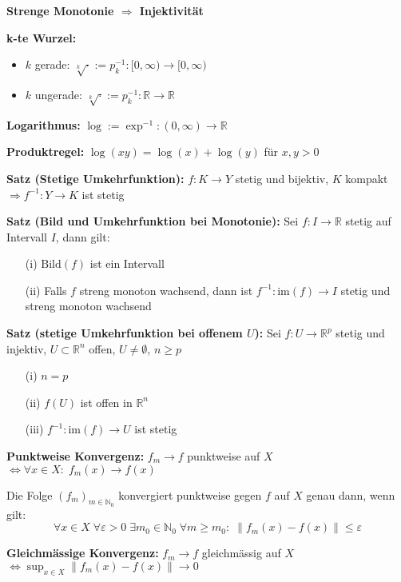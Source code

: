 \begin{itemize}
\textbf{Strenge Monotonie $\Rightarrow$ Injektivität}

\textbf{k-te Wurzel:}
\begin{itemize}
  \item \(k\) gerade: \(\sqrt[k]{\cdot} := p_k^{-1}: [0, \infty) \to [0, \infty)\)
  \item \(k\) ungerade: \(\sqrt[k]{\cdot} := p_k^{-1}: \mathbb{R} \to \mathbb{R}\)
\end{itemize}

\textbf{Logarithmus:}  
\(\log := \exp^{-1} : (0,\infty) \to \mathbb{R}\)

\textbf{Produktregel:}  
\(\log(xy) = \log(x) + \log(y)\) für \(x, y > 0\)

\textbf{Satz (Stetige Umkehrfunktion):}  
\(f: K \to Y\) stetig und bijektiv,\; \(K\) kompakt  
\(\Rightarrow f^{-1}: Y \to K\) ist stetig

\textbf{Satz (Bild und Umkehrfunktion bei Monotonie):}  
Sei \(f: I \to \mathbb{R}\) stetig auf Intervall \(I\), dann gilt:
\begin{itemize}
  \item[(i)] \(\text{Bild}(f)\) ist ein Intervall
  \item[(ii)] Falls \(f\) streng monoton wachsend, dann ist \(f^{-1}: \text{im}(f) \to I\) stetig und streng monoton wachsend
\end{itemize}

\textbf{Satz (stetige Umkehrfunktion bei offenem \(U\)):}  
Sei \(f: U \to \mathbb{R}^p\) stetig und injektiv, \(U \subset \mathbb{R}^n\) offen, \(U \ne \emptyset\), \(n \ge p\)

\begin{itemize}
  \item[(i)] \(n = p\)
  \item[(ii)] \(f(U)\) ist offen in \(\mathbb{R}^n\)
  \item[(iii)] \(f^{-1}: \text{im}(f) \to U\) ist stetig
\end{itemize}


\textbf{Punktweise Konvergenz:}  
\(f_m \to f\) punktweise auf \(X\)  
\(\Leftrightarrow \forall x \in X:\; f_m(x) \to f(x)\)

Die Folge $(f_m)_{m \in \mathbb{N}_0}$ konvergiert punktweise gegen $f$ auf $X$ genau dann, wenn gilt:
\[
\forall x \in X\; \forall \varepsilon > 0\; \exists m_0 \in \mathbb{N}_0\; \forall m \ge m_0:\; \|f_m(x) - f(x)\| \le \varepsilon
\]

\textbf{Gleichmässige Konvergenz:}  
\(f_m \to f\) gleichmässig auf \(X\)  
\(\Leftrightarrow \sup_{x \in X} \|f_m(x) - f(x)\| \to 0\)


\end{itemize}

